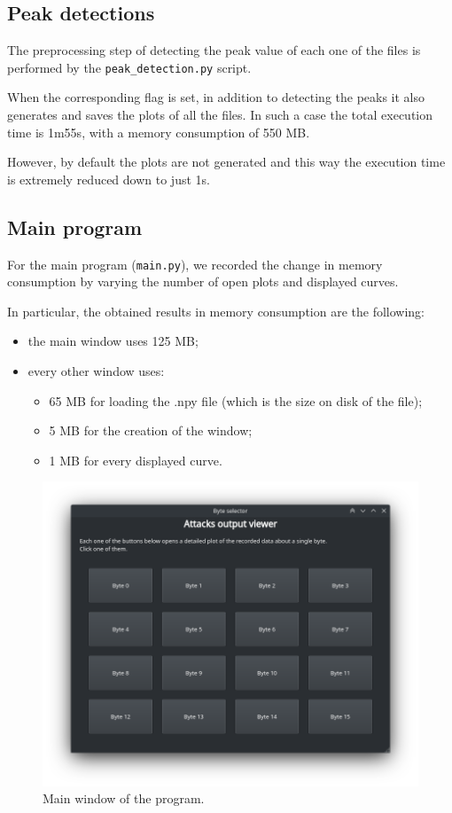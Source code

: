 \documentclass[11pt,a4paper]{article}
\begin{document}
\subsection{Peak detections}

The preprocessing step of detecting the peak value of each one of the files is performed by the \texttt{peak\_detection.py} script.

When the corresponding flag is set, in addition to detecting the peaks it also generates and saves the plots of all the files.
In such a case the total execution time is 1m55s, with a memory consumption of 550 MB.

However, by default the plots are not generated and this way the execution time is extremely reduced down to just 1s.

\subsection{Main program}

For the main program (\texttt{main.py}), we recorded the change in memory consumption by varying the number of open plots and displayed curves.

In particular, the obtained results in memory consumption are the following:
\begin{itemize}
    \item the main window uses 125 MB;
    \item every other window uses:
    \begin{itemize}
    		\item 65 MB for loading the .npy file (which is the size on disk of the file);
    		\item 5 MB for the creation of the window;
    		\item 1 MB for every displayed curve.
	\end{itemize}
\end{itemize}

\begin{figure}[H]
    \centering
    \includegraphics[scale=0.6]{main_window.png}
    \caption{Main window of the program.}
    \label{fig:main_window}
\end{figure}
\end{document}
